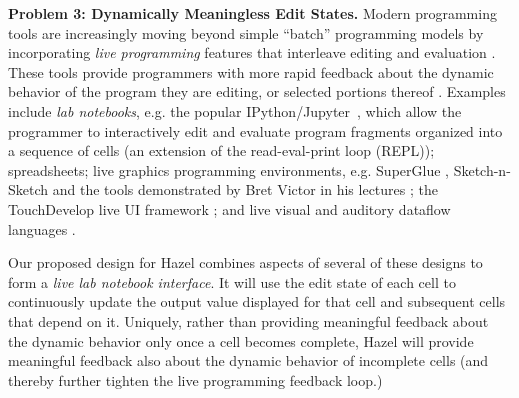 \documentclass{purple}
\newcommand{\Hazel}[0]{\textsf{Hazel}\xspace}
\newcommand{\HazelEnv}[0]{\Hazel\xspace}
\begin{document}
\vspace{0.25ex}
\noindent\textbf{Problem 3: Dynamically Meaningless Edit States.} Modern programming
tools are increasingly moving beyond simple ``batch'' programming models by
incorporating \emph{live programming} features that interleave editing and
evaluation \cite{DBLP:conf/icse/Tanimoto13,DBLP:journals/vlc/Tanimoto90,McDirmid:2007:LUL:1297105.1297073}. These tools provide programmers with more rapid feedback about the
dynamic behavior of the program they are editing, or selected portions thereof \cite{McDirmid:2013:ULP:2509578.2509585}. Examples include \emph{lab notebooks},
e.g. the popular IPython/Jupyter~\cite{Perez:2007:ISI:1251563.1251831}, which allow the
programmer to interactively edit and evaluate program fragments organized into a
sequence of cells (an extension of the read-eval-print loop (REPL)); spreadsheets; {live graphics programming environments}, e.g. SuperGlue \cite{McDirmid:2007:LUL:1297105.1297073}, Sketch-n-Sketch \cite{DBLP:conf/pldi/ChughHSA16,DBLP:conf/icse/Chugh25} and the tools demonstrated by Bret Victor in his lectures \cite{victor2012inventing}; the TouchDevelop live UI framework \cite{burckhardt2013s}; and live visual and auditory dataflow languages \cite{DBLP:conf/vl/BurnettAW98}. 

Our proposed design for \HazelEnv combines aspects of several of these designs to form a \emph{live lab notebook interface}. 
It will use the edit state of each cell to continuously update the output
value displayed for that cell and subsequent cells that depend on
it. Uniquely, rather than providing meaningful feedback about the dynamic
behavior only once a cell becomes complete, \HazelEnv will provide meaningful feedback also
about the dynamic behavior of incomplete cells (and thereby further tighten the live programming 
feedback loop.)
\end{document}
